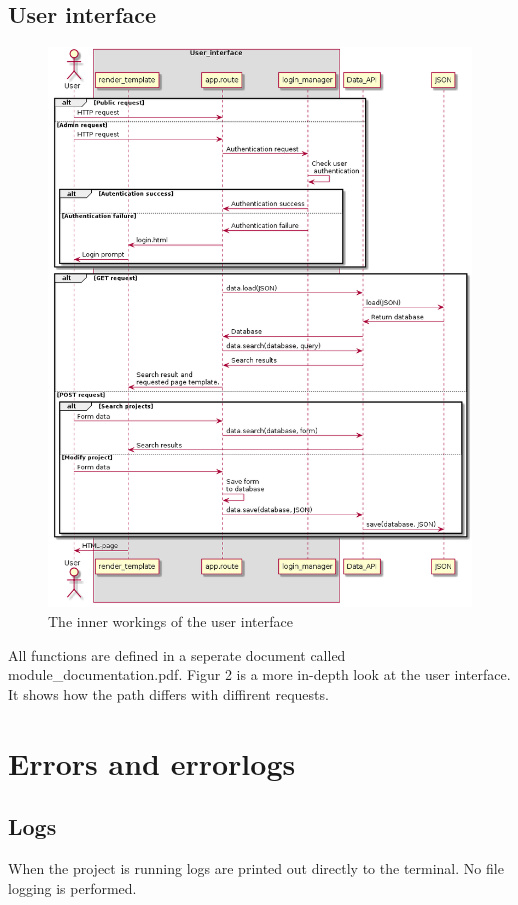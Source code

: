\documentclass{TDP003mall}
\begin{document}
\subsection{User interface}
\begin{figure}[h!]
    \centering
    \includegraphics[width=14cm]{sekvensdiagram2-3.png}
    \caption{The inner workings of the user interface}
    \label{sekvensdiagram2}
\end{figure}
All functions are defined in a seperate document called module\_documentation.pdf.
Figur 2 is a more in-depth look at the user interface. It shows how the path differs with diffirent requests. 
\newpage
\section{Errors and errorlogs}
\subsection{Logs}
When the project is running logs are printed out directly to the terminal.
No file logging is performed.
\end{document}
